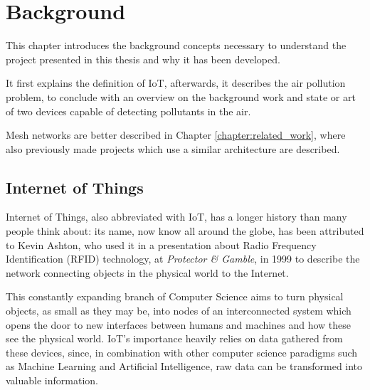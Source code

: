 

\chapter{Background}\label{chapter:background}

	This chapter introduces the background concepts necessary to understand the project presented in this thesis and why it has been developed.
	
	It first explains the definition of IoT, afterwards, it describes the air pollution problem, to conclude with an overview on the background work and state or art of two devices capable of detecting pollutants in the air.

	Mesh networks are better described in Chapter \ref{chapter:related_work}, where also previously made projects which use a similar architecture are described.

	\section{Internet of Things}
	
		
		Internet of Things, also abbreviated with IoT, has a longer history than many people think about: its name, now know all around the globe, has been attributed to Kevin Ashton, who used it in a presentation about Radio Frequency Identification (RFID) technology, at \textit{Protector \& Gamble}, in 1999 \cite{iot_definition} to describe the network connecting objects in the physical world to the Internet.
		
		This constantly expanding branch of Computer Science aims to turn physical objects, as small as they may be, into nodes of an interconnected system which opens the door to new interfaces between humans and machines and how these see the physical world.
		IoT's importance heavily relies on data gathered from these devices, since, in combination with other computer science paradigms such as Machine Learning and Artificial Intelligence, raw data can be transformed into valuable information.
	
